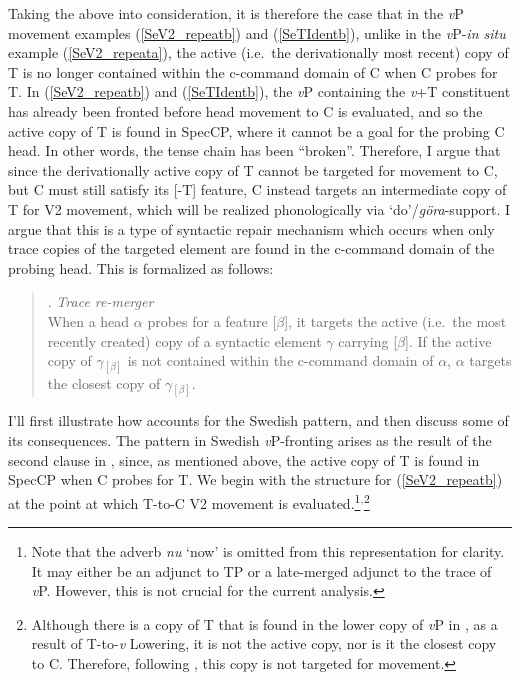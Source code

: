 Taking the above into consideration, it is therefore the case that in the \textit{v}P movement examples (\ref{SeV2_repeatb}) and (\ref{SeTIdentb}), unlike in the \textit{v}P-\textit{in situ} example (\ref{SeV2_repeata}), the active (i.e.\ the derivationally most recent) copy of T is no longer contained within the c-command domain of C when C probes for T. In (\ref{SeV2_repeatb}) and (\ref{SeTIdentb}), the {\it v}P containing the {\it v}+T constituent has already been fronted before head movement to C is evaluated, and so the active copy of T is found in SpecCP, where it cannot be a goal for the probing C head. In other words, the tense chain has been ``broken''. Therefore, I argue that since the derivationally active copy of T cannot be targeted for movement to C, but C must still satisfy its [-T] feature, C instead targets an intermediate copy of T for V2 movement, which will be realized phonologically via `do'/{\it g\"{o}ra}-support. I argue that this is a type of syntactic repair mechanism which occurs when only trace copies of the targeted element are found in the c-command domain of the probing head. This is formalized as follows:

\singlespacing
\begin{quote}
\ex. {\it Trace re-merger}\\
When a head $\alpha$ probes for a feature [$\beta$], it targets the active (i.e.\ the most recently created) copy of a syntactic element $\gamma$ carrying [$\beta$]. If the active copy of $\gamma$$_{[\beta]}$ is not contained within the c-command domain of $\alpha$, $\alpha$ targets the closest copy of $\gamma$$_{[\beta]}$.

\end{quote}
\onehalfspacing
I'll first illustrate how \Last accounts for the Swedish pattern, and then discuss some of its consequences. The pattern in Swedish {\it v}P-fronting arises as the result of the second clause in \Last, since, as mentioned above, the active copy of T is found in SpecCP when C probes for T. We begin with the structure for (\ref{SeV2_repeatb}) at the point at which T-to-C V2 movement is evaluated.\footnote{Note that the adverb \textit{nu} `now' is omitted from this representation for clarity. It may either be an adjunct to TP or a late-merged adjunct to the trace of \textit{v}P. However, this is not crucial for the current analysis.}$^{,}$\footnote{Although there is a copy of T that is found in the lower copy of {\it v}P in \Next, as a result of T-to-{\it v} Lowering, it is not the active copy, nor is it the closest copy to C. Therefore, following \Last, this copy is not targeted for movement.} 

